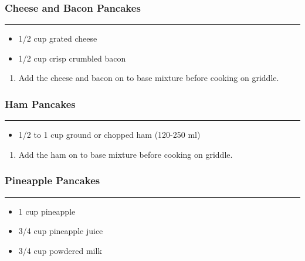 \documentclass{article}
\begin{document}
\subsubsection{Cheese and Bacon Pancakes} 
\noindent\rule[0.5ex]{\linewidth}{0.5pt}

\begin{framed}
    \begin{itemize}
        \item 1/2 cup grated cheese 
        \item 1/2 cup crisp crumbled bacon
    \end{itemize}
\end{framed}

\begin{enumerate}
    \item 
        Add the cheese and bacon on to base mixture before cooking on griddle.
\end{enumerate}

\subsubsection{Ham Pancakes} 
\noindent\rule[0.5ex]{\linewidth}{0.5pt}

\begin{framed}
    \begin{itemize}
        \item 1/2 to 1 cup ground or chopped ham (120-250 ml)
    \end{itemize}
\end{framed}

\begin{enumerate}
    \item 
        Add the ham on to base mixture before cooking on griddle.
\end{enumerate}

\subsubsection{Pineapple Pancakes} 
\noindent\rule[0.5ex]{\linewidth}{0.5pt}

\begin{framed}
    \begin{itemize}
        \item 1 cup pineapple
        \item 3/4 cup pineapple juice
        \item 3/4 cup powdered milk
    \end{itemize}
\end{framed}
\end{document}
